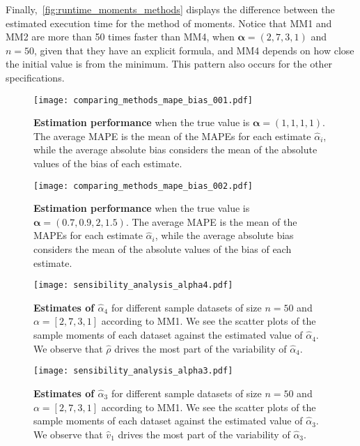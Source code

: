 \documentclass[a4paper, notitlepage, 10pt]{article}
\newcommand{\parameter}{\boldsymbol{\alpha}}
\theoremstyle{definition}
\begin{document}
Finally,~\autoref{fig:runtime_moments_methods} displays the difference between the estimated execution time for the method of moments.
Notice that MM1 and MM2 are more than 50 times faster than MM4, when $\parameter = (2,7,3,1)$ and $n=50$, given that they have an explicit formula, and MM4 depends on how close the initial value is from the minimum.
This pattern also occurs for the other specifications. 

\begin{figure}[!htbp]
    \centering
    \texttt{[image: comparing\_methods\_mape\_bias\_001.pdf]}
    \caption{{\bf Estimation performance} when the true value is $\boldsymbol{\alpha} = (1,1,1,1)$.
    The average MAPE is the mean of the MAPEs for each estimate $\hat\alpha_i$, while the average absolute bias considers the mean of the absolute values of the bias of each estimate.
    }\label{fig:comparing_methods_mape_bias}
\end{figure}

\begin{figure}[!htpb]
    \centering
    \texttt{[image: comparing\_methods\_mape\_bias\_002.pdf]}
    \caption{{\bf Estimation performance} when the true value is $\boldsymbol{\alpha} = (0.7,0.9,2,1.5)$.
    The average MAPE is the mean of the MAPEs for each estimate $\hat\alpha_i$, while the average absolute bias considers the mean of the absolute values of the bias of each estimate.
    }\label{fig:comparing_methods_mape_bias2}
\end{figure}

\begin{figure}[htbp]
    \centering
    \texttt{[image: sensibility\_analysis\_alpha4.pdf]}
    \caption{{\bf Estimates of $\hat{\alpha}_4$} for different sample datasets of size $n=50$ and $\alpha=[2,7,3,1]$ according to MM1. 
    We see the scatter plots of the sample moments of each dataset against the estimated value of $\hat{\alpha}_4$.
    We observe that $\hat{\rho}$ drives the most part of the variability of $\hat{\alpha}_4$.}\label{fig:alpha4_vs_moments}
\end{figure}

\begin{figure}[htbp]
    \centering
    \texttt{[image: sensibility\_analysis\_alpha3.pdf]}
    \caption{{\bf Estimates of $\hat{\alpha}_3$} for different sample datasets of size $n=50$ and $\alpha=[2,7,3,1]$ according to MM1. 
    We see the scatter plots of the sample moments of each dataset against the estimated value of $\hat{\alpha}_3$.
    We observe that $\hat{v}_1$ drives the most part of the variability of $\hat{\alpha}_3$.}\label{fig:alpha3_vs_moments}
\end{figure}
\end{document}
